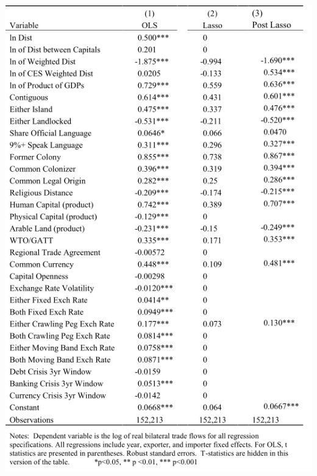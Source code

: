 \begin{frame}
    \vspace{-10pt}
    \begin{center}
    \includegraphics[height=0.85\textheight]{./resources/BaxterOLS}
    \end{center}
\end{frame}

